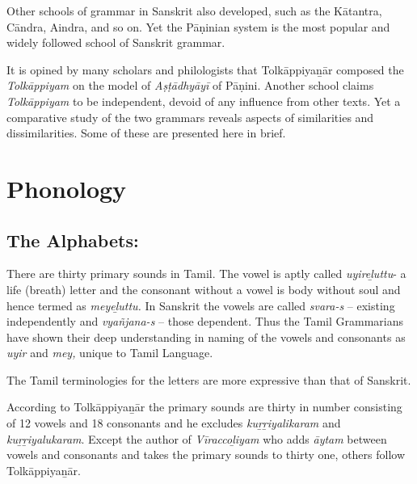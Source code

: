 Other schools of grammar in Sanskrit also developed, such as the Kātantra, Cāndra, Aindra, and so on. Yet the Pāṇinian system is the most popular and widely followed school of Sanskrit grammar.

It is opined by many scholars and philologists that Tolkāppiyaṉār composed the \textit{Tolkāppiyam} on the model of \textit{Aṣṭādhyāyī} of Pāṇini. Another school claims \textit{Tolkāppiyam} to be independent, devoid of any influence from other texts. Yet a comparative study of the two grammars reveals aspects of similarities and dissimilarities. Some of these are presented here in brief.


\section*{Phonology}

\subsection*{The Alphabets:}

There are thirty primary sounds in Tamil. The vowel is aptly called \textit{uyireḻuttu}- a life (breath) letter and the consonant without a vowel is body without soul and hence termed as \textit{meyeḻuttu.} In Sanskrit the vowels are called \textit{svara-s} – existing independently and \textit{vyañjana-s} – those dependent. Thus the Tamil Grammarians have shown their deep understanding in naming of the vowels and consonants as \textit{uyir} and \textit{mey,} unique to Tamil Language.

The Tamil terminologies for the letters are more expressive than that of Sanskrit.

According to Tolkāppiyaṉār the primary sounds are thirty in number consisting of 12 vowels and 18 consonants and he excludes \textit{kuṟṟiyalikaram} and\textit{ kuṟṟiyalukaram}. Except the author of \textit{Vīraccoḻiyam} who adds \textit{āytam} between vowels and consonants and takes the primary sounds to thirty one, others follow Tolkāppiyaṉār.

